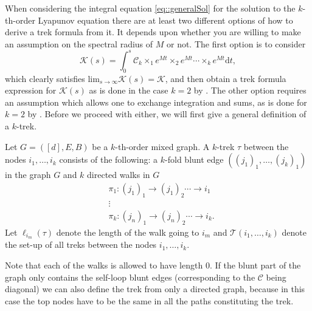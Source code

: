 \documentclass{biometrika}
\begin{document}
When considering the integral equation \eqref{eq::generalSol} for the  solution to the $k$-th-order Lyapunov equation there are at least two different options of how to derive a trek formula from it. It depends upon whether you are willing to make an assumption on the spectral radius of $M$ or not. The first option is to consider
\begin{equation} \label{eq::K(s)eq}
    \mathcal{K} (s) = \int_{0}^{s} \mathcal{C}_k \times_1 e^{M t} \times_2 e^{M t} \cdots \times_{k} e^{M t} \mathrm{d} t,
\end{equation}
which clearly satisfies $\mathrm{lim}_{s \rightarrow \infty} \mathcal{K} (s) = \mathcal{K} $, and then obtain  a trek formula expression for $\mathcal{K} (s)$ as is done in the 
case $k=2$ by \cite{varando20a}.
The other option requires an assumption which allows one to exchange integration and sums, as is done for $k=2$ by \cite{hansen2024trekrulelyapunovequation}. Before we proceed with either, we will first give a general definition of a $k$-trek. 
\begin{definition}
    Let $G = ([d],E,B)$ be a $k$-th-order mixed graph. A $k$-trek $\tau$ between the nodes $i_1, \dots, i_k$ consists
    of the following: a $k$-fold blunt edge $((j_1)_1, \dots ,(j_k)_1)$ in the graph $G$ and $k$ directed walks in $G$
    \begin{align*}
        & \pi_1 :  (j_1)_1 \rightarrow (j_1)_2 \cdots \rightarrow i_1 \\ 
        &\vdots \\ 
        & \pi_k: (j_n)_1 \rightarrow (j_n)_2 \cdots \rightarrow i_k. 
    \end{align*}
    Let $\ell_{i_m}(\tau)$ denote the length of the walk going to $i_m$ and $\mathcal{T}(i_1, \dots, i_k)$ denote the set-up of all treks between the nodes $i_1, \dots, i_k$. 
\end{definition}
Note that each of the walks is allowed to have length $0$. If the blunt part of the graph only contains the self-loop blunt edges (corresponding to the $\mathcal{C}$ being diagonal) we can also  define the trek from only a directed graph, because in this case the top nodes have to be the same in all the paths constituting the trek. 
\end{document}

